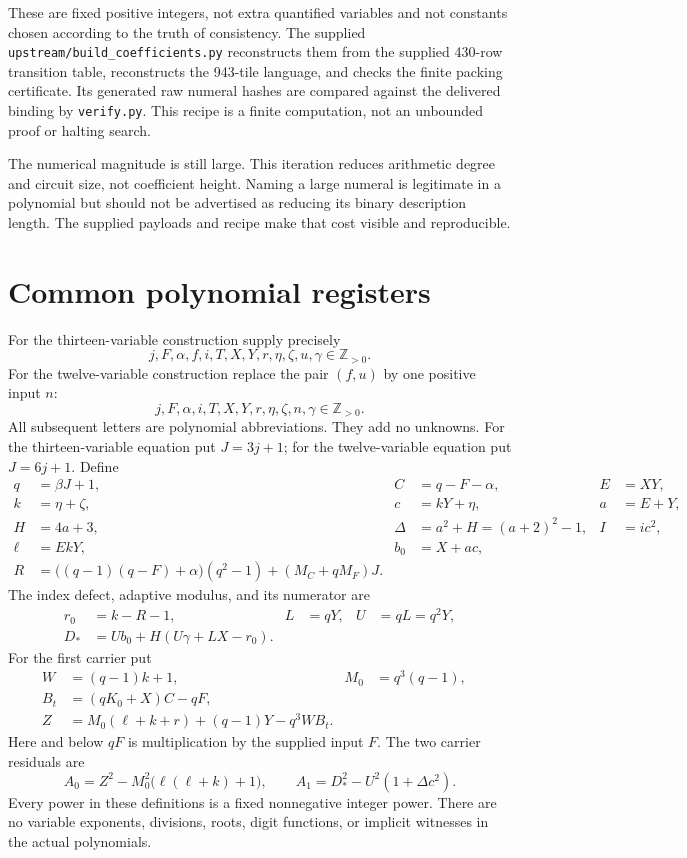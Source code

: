 \documentclass[11pt]{article}
\newcommand{\Zp}{\mathbb Z_{>0}}
\theoremstyle{remark}
\begin{document}
These are fixed positive integers, not extra quantified variables and not
constants chosen according to the truth of consistency. The supplied
\texttt{upstream/build\_coefficients.py} reconstructs them from the supplied
430-row transition table, reconstructs the 943-tile language, and checks the
finite packing certificate. Its generated raw numeral hashes are compared
against the delivered binding by \texttt{verify.py}. This recipe is a
finite computation, not an unbounded proof or halting search.

The numerical magnitude is still large. This iteration reduces arithmetic
degree and circuit size, not coefficient height. Naming a large numeral is
legitimate in a polynomial but should not be advertised as reducing its
binary description length. The supplied payloads and recipe make that cost
visible and reproducible.

\section{Common polynomial registers}
\label{sec:common}

For the thirteen-variable construction supply precisely
\[
 j,F,\alpha,f,i,T,X,Y,r,\eta,\zeta,u,\gamma\in\Zp.
\]
For the twelve-variable construction replace the pair $(f,u)$ by one
positive input $n$:
\[
 j,F,\alpha,i,T,X,Y,r,\eta,\zeta,n,\gamma\in\Zp.
\]
All subsequent letters are polynomial abbreviations. They add no unknowns.
For the thirteen-variable equation put $J=3j+1$; for the twelve-variable
equation put $J=6j+1$. Define
\begin{align}
 q&=\beta J+1,& C&=q-F-\alpha,& E&=XY,\\
 k&=\eta+\zeta,& c&=kY+\eta,& a&=E+Y,\\
 H&=4a+3,& \Delta&=a^2+H=(a+2)^2-1,& I&=ic^2,\\
 \ell&=EkY,& b_0&=X+ac,\\
 R&=\bigl((q-1)(q-F)+\alpha\bigr)(q^2-1)
                  +(M_C+qM_F)J.&&&\label{eq:R}
\end{align}
The index defect, adaptive modulus, and its numerator are
\begin{align}
 r_0&=k-R-1,& L&=qY,& U&=qL=q^2Y,\\
 D_*&=Ub_0+H(U\gamma+LX-r_0).&&&\label{eq:Dstar}
\end{align}
For the first carrier put
\begin{align}
 W&=(q-1)k+1,& M_0&=q^3(q-1),\\
 B_t&=(qK_0+X)C-qF,\\
 Z&=M_0(\ell+k+r)+(q-1)Y-q^3WB_t.&&&\label{eq:Z}
\end{align}
Here and below $qF$ is multiplication by the supplied input $F$.
The two carrier residuals are
\begin{equation}
 A_0=Z^2-M_0^2\bigl(\ell(\ell+k)+1\bigr),\qquad
 A_1=D_*^2-U^2(1+\Delta c^2).
 \label{eq:carriers}
\end{equation}
Every power in these definitions is a fixed nonnegative integer power.
There are no variable exponents, divisions, roots, digit functions, or
implicit witnesses in the actual polynomials.
\end{document}
